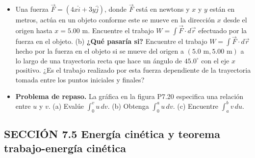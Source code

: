 \documentclass[11pt,a4paper]{article}
\begin{document}
\begin{itemize}
    \item[\textbf{19.}] Una fuerza $\vec{F} = (4x\hat{i} + 3y\hat{j})$, donde $\vec{F}$ está en newtons y $x$ y $y$ están en metros, actúa en un objeto conforme este se mueve en la dirección $x$ desde el origen hasta $x = 5.00 \text{ m}$. Encuentre el trabajo $W = \int \vec{F} \cdot d\vec{r}$ efectuado por la fuerza en el objeto. (b) \textbf{¿Qué pasaría si?} Encuentre el trabajo $W = \int \vec{F} \cdot d\vec{r}$ hecho por la fuerza en el objeto si se mueve del origen a $(5.0 \text{ m}, 5.00 \text{ m})$ a lo largo de una trayectoria recta que hace un ángulo de $45.0^\circ$ con el eje $x$ positivo. ¿Es el trabajo realizado por esta fuerza dependiente de la trayectoria tomada entre los puntos iniciales y finales?
    \vspace*{6cm}

    \item[\textbf{20.}] \textbf{Problema de repaso.} La gráfica en la figura P7.20 especifica una relación entre $u$ y $v$. (a) Evalúe $\int_0^v u\,dv$. (b) Obtenga $\int_0^a u\,dv$. (c) Encuentre $\int_a^b v\,du$.
    \vspace*{6cm}
\end{itemize}

\newpage

\subsection*{SECCIÓN 7.5 Energía cinética y teorema trabajo-energía cinética}
\end{document}
